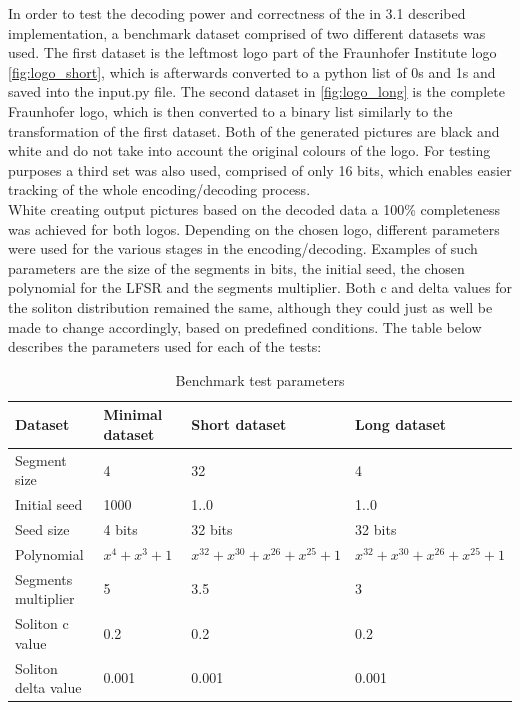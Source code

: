 \documentclass[12pt]%
{article}
\begin{document}
In order to test the decoding power and correctness of the in 3.1 described implementation, a benchmark dataset comprised of two different datasets was used. The first dataset is the leftmost logo part of the Fraunhofer Institute logo \ref{fig:logo_short}, which is afterwards converted to a python list of 0s and 1s and saved into the input.py file. The second dataset in \ref{fig:logo_long} is the complete Fraunhofer logo, which is then converted to a binary list similarly to the transformation of the first dataset. Both of the generated pictures are black and white and do not take into account the original colours of the logo. For testing purposes a third set was also used, comprised of only 16 bits, which enables easier tracking of the whole encoding/decoding process.  \\
White creating output pictures based on the decoded data a 100\% completeness was achieved for both logos. Depending on the chosen logo, different parameters were used for the various stages in the encoding/decoding. Examples of such parameters are the size of the segments in bits, the initial seed, the chosen polynomial for the LFSR and the segments multiplier. Both c and delta values for the soliton distribution remained the same, although they could just as well be made to change accordingly, based on predefined conditions. The table below describes the parameters used for each of the tests: \\


\begin{table}[ht]
    \centering
    \small
    \begin{tabularx}{\textwidth}{|X|X|X|X|}
        \hline
        Dataset & Minimal dataset & Short dataset & Long dataset \\
        \hline
        Segment size & 4 & 32 & 4 \\
        \hline
        Initial seed & 1000 & 1..0 & 1..0 \\
        \hline
        Seed size & 4 bits & 32 bits & 32 bits \\
        \hline
        Polynomial & \(x^{4} + x^{3} + 1 \) & \(x^{32} + x^{30} + x^{26} + x^{25} + 1\) & \(x^{32} + x^{30} + x^{26} + x^{25} + 1\) \\
        \hline
        Segments multiplier & 5 & 3.5 & 3 \\
        \hline
        Soliton c value & 0.2 & 0.2 & 0.2 \\
        \hline
        Soliton delta value & 0.001 & 0.001 & 0.001 \\
        \hline
    \end{tabularx}
    \caption{Benchmark test parameters}
    \label{tab:benchmark-parameters}
\end{table}
\end{document}
